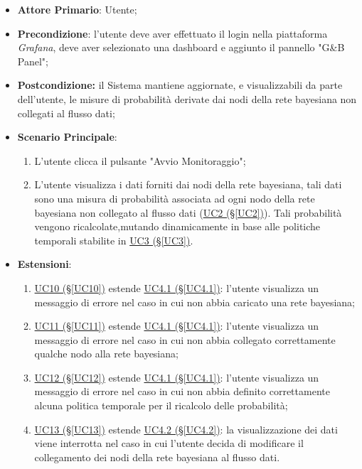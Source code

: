 \begin{itemize}
\item \textbf{Attore Primario}: Utente;
\item \textbf{Precondizione}: l'utente deve aver effettuato il login nella piattaforma \textit{Grafana}, deve aver selezionato una dashboard e aggiunto il pannello "G\&B Panel";
\item \textbf{Postcondizione:} il Sistema mantiene aggiornate, e visualizzabili da parte dell'utente, le misure di probabilità derivate dai nodi della rete bayesiana non collegati al flusso dati;
\item \textbf{Scenario Principale}: 
	\begin{enumerate}
	\item L'utente clicca il pulsante "Avvio Monitoraggio";
	\item L'utente visualizza i dati forniti dai nodi della rete bayesiana, tali dati sono una misura di probabilità 			associata ad ogni nodo della rete bayesiana non collegato al flusso dati (\hyperref[UC2]{UC2 (§\ref*{UC2})}). 				Tali probabilità vengono ricalcolate,mutando dinamicamente in base alle politiche temporali stabilite in 						\hyperref[UC3]{UC3 (§\ref*{UC3})}.
	\end{enumerate}
\item \textbf{Estensioni}:
	\begin{enumerate}
	\item \hyperref[UC10]{UC10 (§\ref*{UC10})} estende \hyperref[UC4.1]{UC4.1 (§\ref*{UC4.1})}: l'utente visualizza un messaggio di errore nel caso in cui non abbia caricato una rete bayesiana;
	\item \hyperref[UC11]{UC11 (§\ref*{UC11})} estende \hyperref[UC4.1]{UC4.1 (§\ref*{UC4.1})}: l'utente visualizza un messaggio di errore nel caso in cui non abbia collegato correttamente qualche nodo alla rete bayesiana;
	\item \hyperref[UC12]{UC12 (§\ref*{UC12})} estende \hyperref[UC4.1]{UC4.1 (§\ref*{UC4.1})}: l'utente visualizza un messaggio di errore nel caso in cui non abbia definito correttamente alcuna politica temporale per il ricalcolo delle probabilità;
	\item \hyperref[UC13]{UC13 (§\ref*{UC13})} estende \hyperref[UC4.2]{UC4.2 (§\ref*{UC4.2})}: la visualizzazione dei dati viene interrotta nel caso in cui l'utente decida di modificare il collegamento dei nodi della rete bayesiana al flusso dati.
	\end{enumerate}
\end{itemize}

